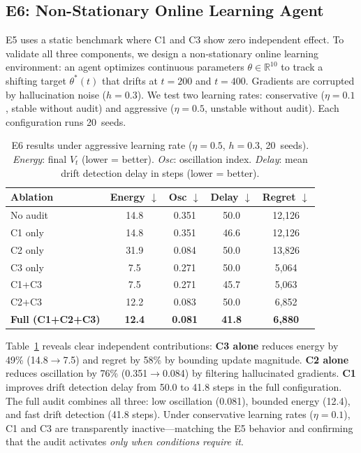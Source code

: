 \documentclass{article}
\begin{document}
\subsection{E6: Non-Stationary Online Learning Agent}
\label{sec:e6}

E5 uses a static benchmark where C1 and C3 show zero independent
effect. To validate all three components, we design a non-stationary
online learning environment: an agent optimizes continuous parameters
$\theta \in \mathbb{R}^{10}$ to track a shifting target
$\theta^{*}(t)$ that drifts at $t{=}200$ and $t{=}400$.
Gradients are corrupted by hallucination noise ($h{=}0.3$).
We test two learning rates: conservative ($\eta{=}0.1$, stable
without audit) and aggressive ($\eta{=}0.5$, unstable without audit).
Each configuration runs 20~seeds.

\begin{table}[t]
  \caption{E6 results under aggressive learning rate ($\eta{=}0.5$,
    $h{=}0.3$, 20~seeds). \emph{Energy}: final $V_t$
    (lower = better). \emph{Osc}: oscillation index.
    \emph{Delay}: mean drift detection delay in steps (lower = better).}
  \label{tab:e6}
  \small
  \begin{tabular}{lcccc}
    \toprule
    Ablation & Energy $\downarrow$ & Osc $\downarrow$ & Delay $\downarrow$ & Regret $\downarrow$ \\
    \midrule
    No audit          & 14.8 & 0.351 & 50.0 & 12{,}126 \\
    C1 only           & 14.8 & 0.351 & 46.6 & 12{,}126 \\
    C2 only           & 31.9 & 0.084 & 50.0 & 13{,}826 \\
    C3 only           & 7.5  & 0.271 & 50.0 & 5{,}064  \\
    \midrule
    C1+C3             & 7.5  & 0.271 & 45.7 & 5{,}063  \\
    C2+C3             & 12.2 & 0.083 & 50.0 & 6{,}852  \\
    \textbf{Full (C1+C2+C3)} & \textbf{12.4} & \textbf{0.081} & \textbf{41.8} & \textbf{6{,}880}  \\
    \bottomrule
  \end{tabular}
\end{table}

Table~\ref{tab:e6} reveals clear independent contributions:
\textbf{C3 alone} reduces energy by 49\% (14.8$\to$7.5) and regret
by 58\% by bounding update magnitude.
\textbf{C2 alone} reduces oscillation by 76\% (0.351$\to$0.084) by
filtering hallucinated gradients.
\textbf{C1} improves drift detection delay from 50.0 to 41.8 steps
in the full configuration.
The full audit combines all three: low oscillation (0.081), bounded
energy (12.4), and fast drift detection (41.8 steps).
Under conservative learning rates ($\eta{=}0.1$), C1 and C3 are
transparently inactive---matching the E5 behavior and confirming
that the audit activates \emph{only when conditions require it}.
\end{document}
